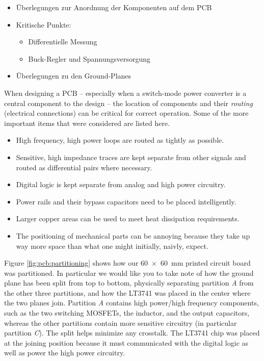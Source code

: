\begin{itemize}
    \item
        \"Uberlegungen zur Anordnung der Komponenten auf dem PCB
    \item
        Kritische Punkte:
        \begin{itemize}
            \item
                Differentielle Messung
            \item
                Buck-Regler und Spannungsversorgung
        \end{itemize}
    \item
        \"Uberlegungen zu den Ground-Planes
\end{itemize}

When designing a PCB --  especially  when  a  switch-mode  power  converter is a
central  component  to  the  design  --  the  location  of  components and their
\emph{routing} (electrical connections) can be  critical  for correct operation.
Some  of  the  more  important  items  that  were  considered  are  listed here.
\begin{itemize}
    \item
        High frequency, high power loops are routed as tightly as possible.
    \item
        Sensitive, high impedance traces are kept separate from other signals
        and routed as differential pairs where necessary.
    \item
        Digital logic is kept separate from analog and high power circuitry.
    \item
        Power rails and their bypass capacitors need to be placed intelligently.
    \item
        Larger copper areas can be used to meet heat dissipation requirements.
    \item
        The positioning of mechanical parts can be annoying because they take up
        way more space than what one might initially, naivly, expect.
\end{itemize}

Figure \ref{fig:pcb:partitioning} shows how our \SI{60x60}{\milli\meter} printed
circuit board was partitioned. In particular we  would  like you to take note of
how the ground plane has been split from  top  to  bottom, physically separating
partition  \emph{A}  from the other three partitions, and  how  the  LT3741  was
placed in the center where the two planes join. Partition \emph{A} contains high
power/high  frequency  components,  such  as  the  two  switching  MOSFETs,  the
inductor, and the output capacitors, whereas  the  other partitions contain more
sensitive circuitry (in particular partition \emph{C}). The split helps minimize
any crosstalk. The LT3741 chip was placed at the  joining  position  because  it
must  communicated  with  the  digital logic as well as  power  the  high  power
circuitry.

